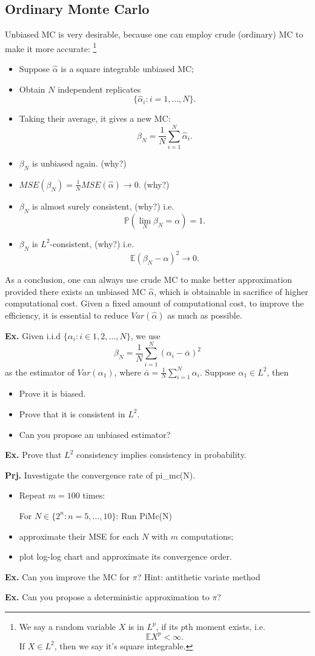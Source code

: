 \documentclass{article}
\begin{document}
\subsection{Ordinary Monte Carlo}
Unbiased MC is very desirable, because one can employ crude (ordinary) MC
to make it more accurate:
\footnote{We say a random variable $X$ is in $L^p$, if its $p$th moment exists, 
i.e. $$\mathbb E X^p <\infty .$$
If $X\in L^2$, then we say it's square integrable.}
\begin{itemize}
 \item Suppose $\hat \alpha$ is a square integrable unbiased MC;
 \item Obtain $N$ independent replicates
 $$\{\hat \alpha_i: i = 1,\ldots, N\}.$$
 \item Taking their average, it gives a new MC:
 $$\beta_N = \frac 1 N \sum_{i=1}^N \hat \alpha_i.$$
 \item $\beta_N$ is unbiased again. (why?)
 \item $MSE(\beta_N) = \frac 1 N MSE(\hat \alpha) \to 0$. (why?)
 \item $\beta_N$ is almost surely consistent,
  (why?)  i.e. 
  $$\mathbb P(\lim_N \beta_N = \alpha) = 1.$$
  \item $\beta_N$ is $L^2$-consistent,  (why?) i.e.
  $$\mathbb E (\beta_N - \alpha)^2 \to 0.$$
\end{itemize}



As a conclusion, one can always use crude MC to make better approximation provided there exists an unbiased MC $\hat \alpha$, which is obtainable in sacrifice of  higher computational cost.
Given a fixed amount of computational cost, to improve the efficiency, it is essential to reduce $Var(\hat \alpha)$ as much as possible.


{\bf Ex.}
Given i.i.d $\{\alpha_i: i\in 1, 2, \ldots, N\}$, we use 
$$\beta_N = \frac 1 N \sum_{i=1}^N (\alpha_i -\bar \alpha)^2$$
as the estimator of $Var(\alpha_1)$, where $\bar \alpha = \frac 1 N \sum_{i=1}^N \alpha_i$. Suppose $\alpha_1\in L^2$, then 
\begin{itemize}
 \item Prove it is biased.
 \item Prove that it is consistent in $L^2$.
 \item Can you propose an unbiased estimator?
\end{itemize}

{\bf Ex.}
Prove that $L^2$ consistency implies consistency in probability.

{\bf Prj.} Investigate the convergence rate of pi\_mc(N).
\begin{itemize}
\item Repeat $m = 100$ times:
	
	\quad For $N \in \{2^n: n = 5, \ldots, 10\}$: Run PiMc(N)
\item approximate their MSE for each $N$ with $m$ computations;
\item plot log-log chart and approximate its convergence order.
\end{itemize}

{\bf Ex.} Can you improve the MC for $\pi$? Hint: antithetic variate method

{\bf Ex.} Can you propose a deterministic approximation to $\pi$?
\end{document}
